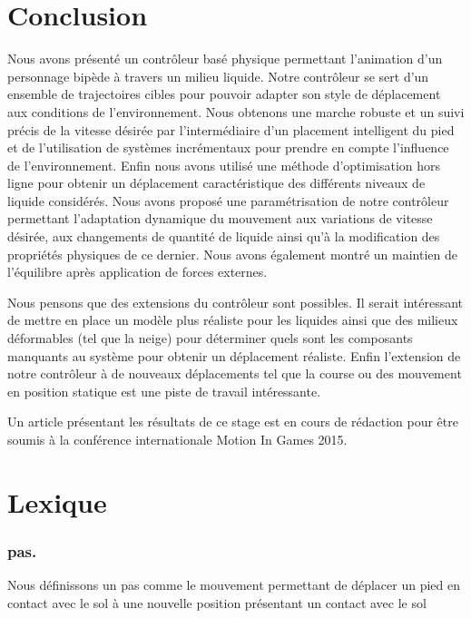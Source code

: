 \documentclass[runningheads,a4paper]{llncs}
\begin{document}
\section{Conclusion}
\label{sec:conclusion}
%
Nous avons présenté un contrôleur basé physique permettant l'animation d'un personnage bipède à travers un milieu liquide. Notre contrôleur se sert d'un ensemble de trajectoires cibles pour pouvoir adapter son style de déplacement aux conditions de l'environnement. Nous obtenons une marche robuste et un suivi précis de la vitesse désirée par l'intermédiaire d'un placement intelligent du pied et de l'utilisation de systèmes incrémentaux pour prendre en compte l'influence de l'environnement. Enfin nous avons utilisé une méthode d'optimisation hors ligne pour obtenir un déplacement caractéristique des différents niveaux de liquide considérés.
Nous avons proposé une paramétrisation de notre contrôleur permettant l'adaptation dynamique du mouvement aux variations de vitesse désirée, aux changements de quantité de liquide ainsi qu'à la modification des propriétés physiques de ce dernier. Nous avons également montré un maintien de l'équilibre après application de forces externes.

Nous pensons que des extensions du contrôleur sont possibles. Il serait intéressant de mettre en place un modèle plus réaliste pour les liquides ainsi que des milieux déformables (tel que la neige) pour déterminer quels sont les composants manquants au système pour obtenir un déplacement réaliste. Enfin l'extension de notre contrôleur à de nouveaux déplacements tel que la course ou des mouvement en position statique est une piste de travail intéressante. 

Un article présentant les résultats de ce stage est en cours de rédaction pour être soumis à la conférence internationale Motion In Games 2015.
%



%
\nocite{*}


%
\newpage

\appendix
\section{Lexique}
\label{sec:lexique}
\subsubsection{pas.} Nous définissons un pas comme le mouvement permettant de déplacer un pied en contact avec le sol à une nouvelle position présentant un contact avec le sol
\end{document}
